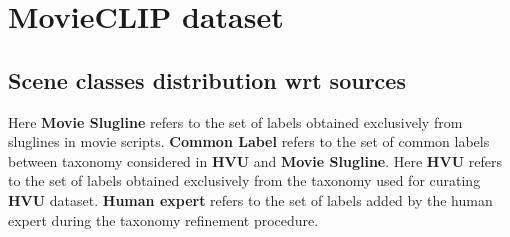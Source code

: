 \section{MovieCLIP dataset}
\label{app:scene_categories}

\subsection{Scene classes distribution wrt sources}
Here \textbf{Movie Slugline} refers to the set of labels obtained exclusively from sluglines in movie scripts. \textbf{Common Label} refers to the set of common labels between taxonomy considered in \textbf{HVU} \cite{diba_large_2020} and \textbf{Movie Slugline}. Here \textbf{HVU} \cite{diba_large_2020} refers to the set of labels obtained exclusively from the taxonomy used for curating \textbf{HVU} \cite{diba_large_2020} dataset. \textbf{Human expert} refers to the set of labels added by the human expert during the taxonomy refinement procedure.


